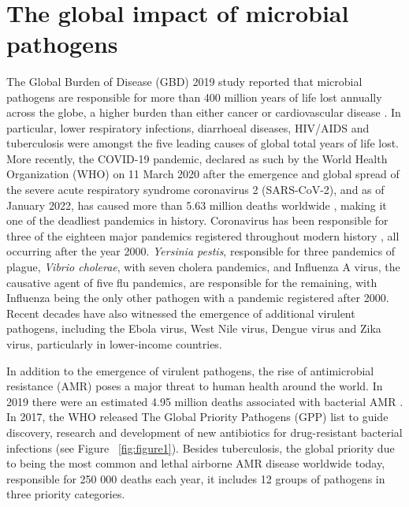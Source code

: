 \mbox{}\\
\vspace{8cm}

\section{The global impact of microbial pathogens} \label{sec:global_impact}

The Global Burden of Disease (GBD) 2019 study reported that microbial pathogens are responsible for more than 400 million years of life lost annually across the globe, a higher burden than either cancer or cardiovascular disease \citep{vos_global_2020}. 
In particular, lower respiratory infections, diarrhoeal diseases, HIV/AIDS and tuberculosis were amongst the five leading causes of global total years of life lost. 
More recently, the COVID-19 pandemic, declared as such by the World Health Organization (WHO) on 11 March 2020 after the emergence and global spread of the severe acute respiratory syndrome coronavirus 2 (SARS-CoV-2), and as of January 2022, has caused more than 5.63 million deaths worldwide \citep{ritchie_coronavirus_2020}, making it one of the deadliest pandemics in history.
Coronavirus has been responsible for three of the eighteen major pandemics registered throughout modern history \citep{piret_pandemics_2021}, all occurring after the year 2000.
\textit{Yersinia pestis}, responsible for three pandemics of plague, \textit{Vibrio cholerae}, with seven cholera pandemics, and Influenza A virus, the causative agent of five flu pandemics, are responsible for the remaining, with Influenza being the only other pathogen with a pandemic registered after 2000. 
Recent decades have also witnessed the emergence of additional virulent pathogens, including the Ebola virus, West Nile virus, Dengue virus and Zika virus, particularly in lower-income countries.

In addition to the emergence of virulent pathogens, the rise of antimicrobial resistance (AMR) poses a major threat to human health around the world. 
In 2019 there were an estimated 4.95 million deaths associated with bacterial AMR \citep{murray_global_2022}. In 2017, the WHO released The Global Priority Pathogens (GPP) list \citep{world_health_organization_prioritization_2017} to guide discovery, research and development of new antibiotics for drug-resistant bacterial infections (see Figure ~\ref{fig:figure1}). 
Besides tuberculosis, the global priority due to being the most common and lethal airborne AMR disease worldwide today, responsible for 250 000 deaths each year, it includes 12 groups of pathogens in three priority categories. 

